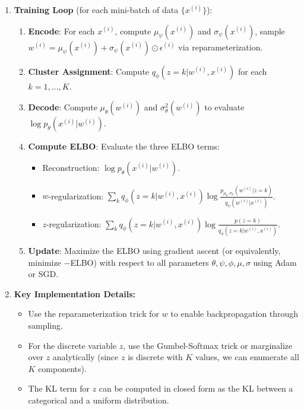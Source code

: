 \documentclass{article}
\begin{document}
{\begin{enumerate}
\begin{enumerate}
            \item \textbf{Training Loop} (for each mini-batch of data $\{x^{(i)}\}$):
            \begin{enumerate}
                \item \textbf{Encode}: For each $x^{(i)}$, compute $\mu_\psi(x^{(i)})$ and $\sigma_\psi(x^{(i)})$, sample $w^{(i)} = \mu_\psi(x^{(i)}) + \sigma_\psi(x^{(i)}) \odot \epsilon^{(i)}$ via reparameterization.
                \item \textbf{Cluster Assignment}: Compute $q_\phi(z=k|w^{(i)}, x^{(i)})$ for each $k = 1,\ldots,K$.
                \item \textbf{Decode}: Compute $\mu_\theta(w^{(i)})$ and $\sigma^2_\theta(w^{(i)})$ to evaluate $\log p_\theta(x^{(i)}|w^{(i)})$.
                \item \textbf{Compute ELBO}: Evaluate the three ELBO terms:
                \begin{itemize}
                    \item Reconstruction: $\log p_\theta(x^{(i)}|w^{(i)})$.
                    \item $w$-regularization: $\sum_k q_\phi(z=k|w^{(i)},x^{(i)}) \log \frac{p_{\mu_k,\sigma_k}(w^{(i)}|z=k)}{q_\psi(w^{(i)}|x^{(i)})}$.
                    \item $z$-regularization: $\sum_k q_\phi(z=k|w^{(i)},x^{(i)}) \log \frac{p(z=k)}{q_\phi(z=k|w^{(i)},x^{(i)})}$.
                \end{itemize}
                \item \textbf{Update}: Maximize the ELBO using gradient ascent (or equivalently, minimize $-$ELBO) with respect to all parameters $\theta, \psi, \phi, \mu, \sigma$ using Adam or SGD.
            \end{enumerate}

            \item \textbf{Key Implementation Details:}
            \begin{itemize}
                \item Use the reparameterization trick for $w$ to enable backpropagation through sampling.
                \item For the discrete variable $z$, use the Gumbel-Softmax trick or marginalize over $z$ analytically (since $z$ is discrete with $K$ values, we can enumerate all $K$ components).
                \item The KL term for $z$ can be computed in closed form as the KL between a categorical and a uniform distribution.
            \end{itemize}
        \end{enumerate}
    \end{enumerate}
}
\end{document}
